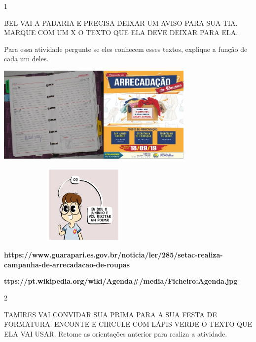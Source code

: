 {{{{\num{1}

BEL VAI A PADARIA E PRECISA DEIXAR UM AVISO PARA SUA TIA. MARQUE COM UM
X O TEXTO QUE ELA DEVE DEIXAR PARA ELA.

Para essa atividade pergunte se eles conhecem esses textos, explique a
função de cada um deles.

\includegraphics[width=2.10625in,height=1.86042in]{media/image93.jpeg}\includegraphics[width=1.68611in,height=1.86042in]{media/image94.jpeg}

\includegraphics[width=3.36528in,height=1.53611in]{media/image97.png}

\textbf{https://www.guarapari.es.gov.br/noticia/ler/285/setac-realiza-campanha-de-arrecadacao-de-roupas}

\textbf{ttps://pt.wikipedia.org/wiki/Agenda\#/media/Ficheiro:Agenda.jpg}

\num{2}

TAMIRES VAI CONVIDAR SUA PRIMA PARA A SUA FESTA DE FORMATURA. ENCONTE E
CIRCULE COM LÁPIS VERDE O TEXTO QUE ELA VAI USAR. Retome as orientações
anterior para realiza a atividade.

}}}}

